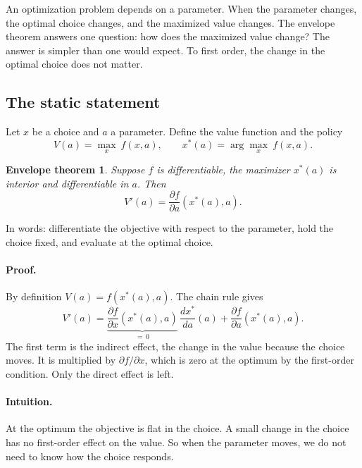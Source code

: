 \documentclass[11pt]{article}
\newtheorem*{envelope}{Envelope theorem}
\begin{document}
An optimization problem depends on a parameter. When the parameter changes, the optimal choice changes, and the maximized value changes. The envelope theorem answers one question: how does the maximized value change? The answer is simpler than one would expect. To first order, the change in the optimal choice does not matter.

\subsection{The static statement}

Let $x$ be a choice and $a$ a parameter. Define the value function and the policy
\begin{equation*}
V(a) = \max_{x} \ f(x, a), \qquad x^{*}(a) = \arg\max_{x} \ f(x, a) .
\end{equation*}

\begin{envelope}
Suppose $f$ is differentiable, the maximizer $x^{*}(a)$ is interior and differentiable in $a$. Then
\begin{equation*}
V'(a) = \frac{\partial f}{\partial a} \left( x^{*}(a), a \right) .
\end{equation*}
\end{envelope}

In words: differentiate the objective with respect to the parameter, hold the choice fixed, and evaluate at the optimal choice.

\paragraph{Proof.} By definition $V(a) = f(x^{*}(a), a)$. The chain rule gives
\begin{equation*}
V'(a) = \underbrace{\frac{\partial f}{\partial x} \left( x^{*}(a), a \right)}_{= \, 0} \, \frac{d x^{*}}{d a}(a) + \frac{\partial f}{\partial a} \left( x^{*}(a), a \right) .
\end{equation*}
The first term is the indirect effect, the change in the value because the choice moves. It is multiplied by $\partial f / \partial x$, which is zero at the optimum by the first-order condition. Only the direct effect is left.

\paragraph{Intuition.} At the optimum the objective is flat in the choice. A small change in the choice has no first-order effect on the value. So when the parameter moves, we do not need to know how the choice responds.
\end{document}
